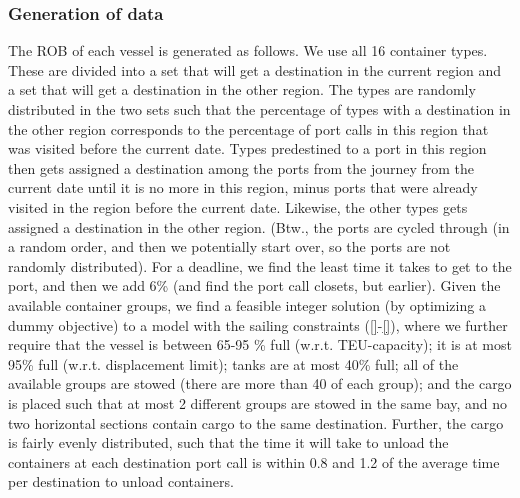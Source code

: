 \subsubsection*{Generation of data} 
The ROB of each vessel is generated as follows. We use all 16 container types. These are divided into a set that will get a destination in the current region and a set that will get a destination in the other region. The types are randomly distributed in the two sets such that the percentage of types with a destination in the other region corresponds to the percentage of port calls in this region that was visited before the current date. Types predestined to a port in this region then gets assigned a destination among the ports from the journey from the current date until it is no more in this region, minus ports that were already visited in the region before the current date. Likewise, the other types gets assigned a destination in the other region. (Btw., the ports are cycled through (in a random order, and then we potentially start over, so the ports are not randomly distributed). For a deadline, we find the least time it takes to get to the port, and then we add 6\% (and find the port call closets, but earlier).
Given the available container groups, we find a feasible integer solution (by optimizing a dummy objective) to a model with the sailing constraints (\ref{}-\ref{}), where we further require that the vessel is between 65-95 \% full (w.r.t. TEU-capacity); it is at most 95\% full (w.r.t. displacement limit); tanks are at most 40\% full; all of the available groups are stowed (there are more than 40 of each group); and the cargo is placed such that at most 2 different groups are stowed in the same bay, and no two horizontal sections contain cargo to the same destination. Further, the cargo is fairly evenly distributed, such that the time it will take to unload the containers at each destination port call is within 0.8 and 1.2 of the average time per destination to unload containers.

